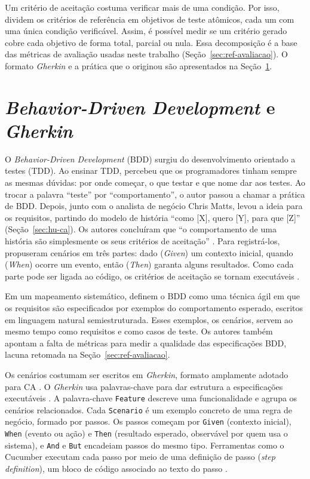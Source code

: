 Um critério de aceitação costuma verificar mais de uma condição. Por isso,  dividem os critérios de referência em objetivos de teste atômicos, cada um com uma única condição verificável. Assim, é possível medir se um critério gerado cobre cada objetivo de forma total, parcial ou nula. Essa decomposição é a base das métricas de avaliação usadas neste trabalho (Seção~\ref{sec:ref-avaliacao}). O formato \textit{Gherkin} e a prática que o originou são apresentados na Seção~\ref{sec:bdd}.

\section{\textit{Behavior-Driven Development} e \textit{Gherkin}}
\label{sec:bdd}

O \textit{Behavior-Driven Development} (BDD) surgiu do desenvolvimento orientado a testes (TDD). Ao ensinar TDD,  percebeu que os programadores tinham sempre as mesmas dúvidas: por onde começar, o que testar e que nome dar aos testes. Ao trocar a palavra ``teste'' por ``comportamento'', o autor passou a chamar a prática de BDD. Depois, junto com o analista de negócio Chris Matts, levou a ideia para os requisitos, partindo do modelo de história ``como [X], quero [Y], para que [Z]'' (Seção~\ref{sec:hu-ca}). Os autores concluíram que ``o comportamento de uma história são simplesmente os seus critérios de aceitação'' \cite[não paginado, tradução nossa]{north2006}. Para registrá-los, propuseram cenários em três partes: dado (\textit{Given}) um contexto inicial, quando (\textit{When}) ocorre um evento, então (\textit{Then}) garanta alguns resultados. Como cada parte pode ser ligada ao código, os critérios de aceitação se tornam executáveis \cite{north2006}.

Em um mapeamento sistemático,  definem o BDD como uma técnica ágil em que os requisitos são especificados por exemplos do comportamento esperado, escritos em linguagem natural semiestruturada. Esses exemplos, os cenários, servem ao mesmo tempo como requisitos e como casos de teste. Os autores também apontam a falta de métricas para medir a qualidade das especificações BDD, lacuna retomada na Seção~\ref{sec:ref-avaliacao}.

Os cenários costumam ser escritos em \textit{Gherkin}, formato amplamente adotado para CA \cite{wang2025}. O \textit{Gherkin} usa palavras-chave para dar estrutura a especificações executáveis \cite{cucumber2026}. A palavra-chave \texttt{Feature} descreve uma funcionalidade e agrupa os cenários relacionados. Cada \texttt{Scenario} é um exemplo concreto de uma regra de negócio, formado por passos. Os passos começam por \texttt{Given} (contexto inicial), \texttt{When} (evento ou ação) e \texttt{Then} (resultado esperado, observável por quem usa o sistema), e \texttt{And} e \texttt{But} encadeiam passos do mesmo tipo. Ferramentas como o Cucumber executam cada passo por meio de uma definição de passo (\textit{step definition}), um bloco de código associado ao texto do passo \cite{cucumber2026}.

